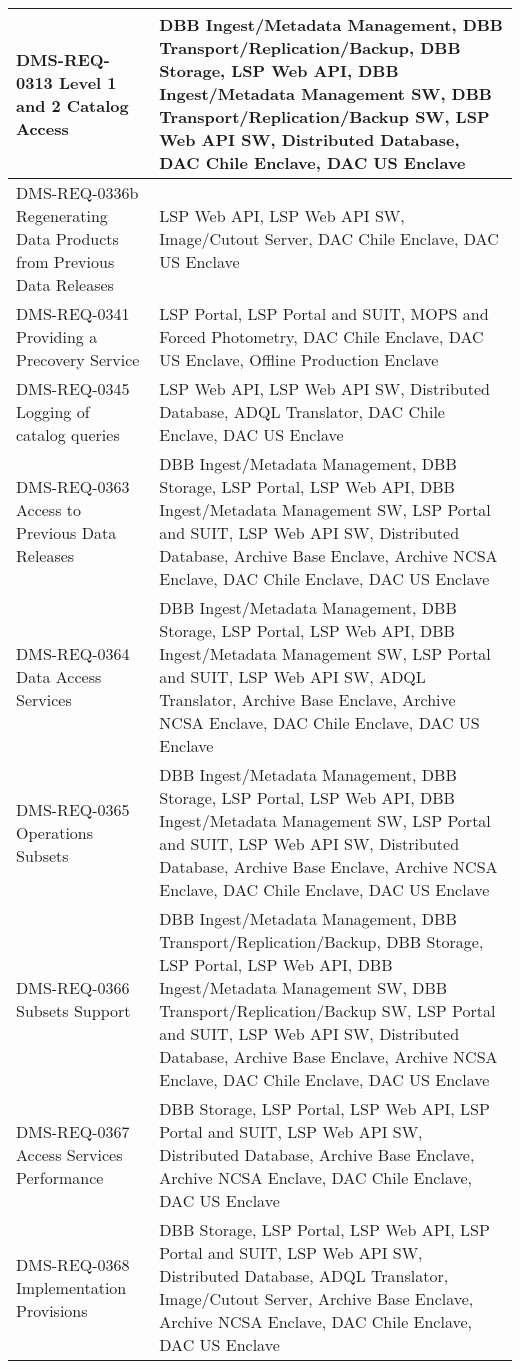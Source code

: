 \begin{longtable}{p{}p{}}
DMS-REQ-0313 Level 1 and 2 Catalog Access & DBB Ingest/Metadata Management, DBB Transport/Replication/Backup, DBB Storage, LSP Web API, DBB Ingest/Metadata Management SW, DBB Transport/Replication/Backup SW, LSP Web API SW, Distributed Database, DAC Chile Enclave, DAC US Enclave \\ \hline
DMS-REQ-0336b Regenerating Data Products from Previous Data Releases & LSP Web API, LSP Web API SW, Image/Cutout Server, DAC Chile Enclave, DAC US Enclave \\ \hline
DMS-REQ-0341 Providing a Precovery Service & LSP Portal, LSP Portal and SUIT, MOPS and Forced Photometry, DAC Chile Enclave, DAC US Enclave, Offline Production Enclave \\ \hline
DMS-REQ-0345 Logging of catalog queries & LSP Web API, LSP Web API SW, Distributed Database, ADQL Translator, DAC Chile Enclave, DAC US Enclave \\ \hline
DMS-REQ-0363 Access to Previous Data Releases & DBB Ingest/Metadata Management, DBB Storage, LSP Portal, LSP Web API, DBB Ingest/Metadata Management SW, LSP Portal and SUIT, LSP Web API SW, Distributed Database, Archive Base Enclave, Archive NCSA Enclave, DAC Chile Enclave, DAC US Enclave \\ \hline
DMS-REQ-0364 Data Access Services & DBB Ingest/Metadata Management, DBB Storage, LSP Portal, LSP Web API, DBB Ingest/Metadata Management SW, LSP Portal and SUIT, LSP Web API SW, ADQL Translator, Archive Base Enclave, Archive NCSA Enclave, DAC Chile Enclave, DAC US Enclave \\ \hline
DMS-REQ-0365 Operations Subsets & DBB Ingest/Metadata Management, DBB Storage, LSP Portal, LSP Web API, DBB Ingest/Metadata Management SW, LSP Portal and SUIT, LSP Web API SW, Distributed Database, Archive Base Enclave, Archive NCSA Enclave, DAC Chile Enclave, DAC US Enclave \\ \hline
DMS-REQ-0366 Subsets Support & DBB Ingest/Metadata Management, DBB Transport/Replication/Backup, DBB Storage, LSP Portal, LSP Web API, DBB Ingest/Metadata Management SW, DBB Transport/Replication/Backup SW, LSP Portal and SUIT, LSP Web API SW, Distributed Database, Archive Base Enclave, Archive NCSA Enclave, DAC Chile Enclave, DAC US Enclave \\ \hline
DMS-REQ-0367 Access Services Performance & DBB Storage, LSP Portal, LSP Web API, LSP Portal and SUIT, LSP Web API SW, Distributed Database, Archive Base Enclave, Archive NCSA Enclave, DAC Chile Enclave, DAC US Enclave \\ \hline
DMS-REQ-0368 Implementation Provisions & DBB Storage, LSP Portal, LSP Web API, LSP Portal and SUIT, LSP Web API SW, Distributed Database, ADQL Translator, Image/Cutout Server, Archive Base Enclave, Archive NCSA Enclave, DAC Chile Enclave, DAC US Enclave \\ \hline

\end{longtable}

